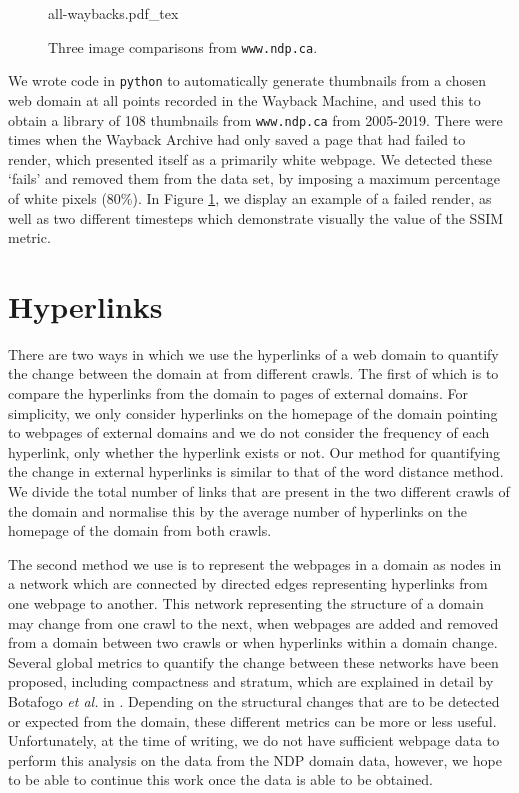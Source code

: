 \documentclass[10pt, a4paper]{article}
\begin{document}
\begin{figure}[h!]
\centering
\def\svgwidth{
0.7\columnwidth}
{all-waybacks.pdf_tex}
  \caption{Three image comparisons from \texttt{www.ndp.ca}.}
\label{fig::wayback_images}
\end{figure}

We wrote code in \texttt{python} to automatically generate thumbnails from a chosen web domain at all points recorded in the Wayback Machine, and used this to obtain a library of 108 thumbnails from \texttt{www.ndp.ca} from 2005-2019. There were times when the Wayback Archive had only saved a page that had failed to render, which presented itself as a primarily white webpage. We detected these `fails' and removed them from the data set, by imposing a maximum percentage of white pixels (80\%). In Figure \ref{fig::wayback_images}, we display an example of a failed render, as well as two different timesteps which demonstrate visually the value of the SSIM metric.
\vspace{-3mm}

\section{Hyperlinks}
\label{sec:links}
\vspace{-2mm}
 There are two ways in which we use the hyperlinks of a web domain to quantify the change between the domain at from different crawls.
 The first of which is to compare the hyperlinks from the domain to pages of external domains.
 For simplicity, we only consider hyperlinks on the homepage of the domain pointing to webpages of external domains and we do not consider the frequency of each hyperlink, only whether the hyperlink exists or not.
 Our method for quantifying the change in external hyperlinks is similar to that of the word distance method.
 We divide the total number of links that are present in the two different crawls of the domain and normalise this by the average number of hyperlinks on the homepage of the domain from both crawls.
 
 The second method we use is to represent the webpages in a domain as nodes in a network which are connected by directed edges representing hyperlinks from one webpage to another.
 This network representing the structure of a domain may change from one crawl to the next, when webpages are added and removed from a domain between two crawls or when hyperlinks within a domain change.
 Several global metrics to quantify the change between these networks have been proposed, including compactness and stratum, which are explained in detail by Botafogo \textit{et al.} in \cite{botafogo1992structural}.
 Depending on the structural changes that are to be detected or expected from the domain, these different metrics can be more or less useful.
 Unfortunately, at the time of writing, we do not have sufficient webpage data to perform this analysis on the data from the NDP domain data, however, we hope to be able to continue this work once the data is able to be obtained.
\vspace{-3mm}
\end{document}
